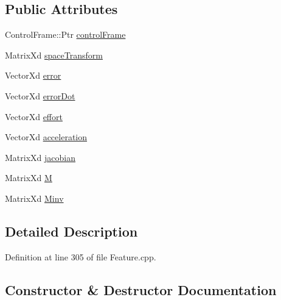 \subsection*{Public Attributes}
\begin{DoxyCompactItemize}
\item 
Control\+Frame\+::\+Ptr \hyperlink{structocra_1_1PointContactFeature_1_1Pimpl_a1988b1e00c4db34a5afdac8f92b8e542}{control\+Frame}
\item 
Matrix\+Xd \hyperlink{structocra_1_1PointContactFeature_1_1Pimpl_a2636a91b8abaabb52ac34a4121e9e115}{space\+Transform}
\item 
Vector\+Xd \hyperlink{structocra_1_1PointContactFeature_1_1Pimpl_aabf12f72f637db8c9fac8208f513ab48}{error}
\item 
Vector\+Xd \hyperlink{structocra_1_1PointContactFeature_1_1Pimpl_a9dc4c6e3ed1c44c57bf5543197eaca17}{error\+Dot}
\item 
Vector\+Xd \hyperlink{structocra_1_1PointContactFeature_1_1Pimpl_ad35d11a459c7be6bae5fe8005c734ffa}{effort}
\item 
Vector\+Xd \hyperlink{structocra_1_1PointContactFeature_1_1Pimpl_a31eac1c12e3c617613656a3efdff310c}{acceleration}
\item 
Matrix\+Xd \hyperlink{structocra_1_1PointContactFeature_1_1Pimpl_a324288a2a8620b723b27d8e4d0c54a79}{jacobian}
\item 
Matrix\+Xd \hyperlink{structocra_1_1PointContactFeature_1_1Pimpl_aa282b2bf576f7d24103a24ffbafba657}{M}
\item 
Matrix\+Xd \hyperlink{structocra_1_1PointContactFeature_1_1Pimpl_a2dfc0e883abbf6c22aace78df3677bb7}{Minv}
\end{DoxyCompactItemize}


\subsection{Detailed Description}


Definition at line 305 of file Feature.\+cpp.



\subsection{Constructor \& Destructor Documentation}
\hypertarget{structocra_1_1PointContactFeature_1_1Pimpl_aee2b366b499152deb1659571bb621ac8}{}\label{structocra_1_1PointContactFeature_1_1Pimpl_aee2b366b499152deb1659571bb621ac8} 
